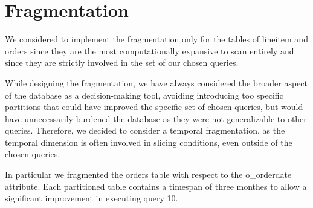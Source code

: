 \section{Fragmentation}
We considered to implement the fragmentation only for the tables of lineitem and orders since they are the most computationally expansive to scan entirely and since they are strictly involved in the set of our chosen queries.

While designing the fragmentation, we have always considered the broader aspect of the database as a decision-making tool, avoiding introducing too specific partitions that could have improved the specific set of chosen queries, but would have unnecessarily burdened the database as they were not generalizable to other queries. Therefore, we decided to consider a temporal fragmentation, as the temporal dimension is often involved in slicing conditions, even outside of the chosen queries. 

In particular we fragmented the orders table with respect to the o\_orderdate attribute. Each partitioned table contains a timespan of three monthes to allow a significant improvement in executing query 10. 